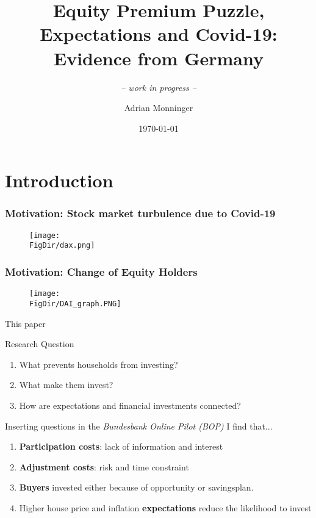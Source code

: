 \documentclass[pdflatex]{beamer}
\title[EPP, Expectations and Covid-19] {Equity Premium Puzzle, Expectations and Covid-19:\\ Evidence from Germany}
\subtitle{ \vspace{0.25em} \textit{-- work in progress --} }
\author[A. Monninger]{Adrian Monninger\inst{1}}
\institute[]{\inst{1} Johns Hopkins University}
\date{\today}
\begin{document}


\begin{frame}
	\titlepage
\end{frame}


\section{Introduction}
\begin{frame}[label = motivation_2]
	\frametitle{Motivation: Stock market turbulence due to Covid-19}
	\begin{figure}
		\centering
		\texttt{[image: \\FigDir/dax.png]}
	\end{figure}
	\hyperlink{sp500}{}
	\hyperlink{eurostoxx50}{}
\end{frame}

\begin{frame}[label = motivation_2]
	\frametitle{Motivation: Change of Equity Holders}
	\begin{figure}
		\centering
		\texttt{[image: \\FigDir/DAI\_graph.PNG]}
	\end{figure}
\end{frame}

\begin{frame}{This paper}
	
	\begin{block}{Research Question}
		{\begin{enumerate}
				\item What prevents households from investing?
				\item What make them invest?
				\item How are expectations and financial investments connected?
		\end{enumerate}}
	\end{block}
	\vspace{1em}
	\pause
	\begin{block}{Inserting questions in the \textit{Bundesbank Online Pilot (BOP)} I find that...}
		{
			\pause
			\begin{enumerate}
				\item \textbf{Participation costs}: lack of information and interest
				\item \textbf{Adjustment costs}: risk and time constraint
				\item \textbf{Buyers} invested either because of opportunity or savingsplan. 
				\item Higher house price and inflation \textbf{expectations} reduce the likelihood to invest
			\end{enumerate}
		}
		
	\end{block}
\end{frame}
\end{document}
